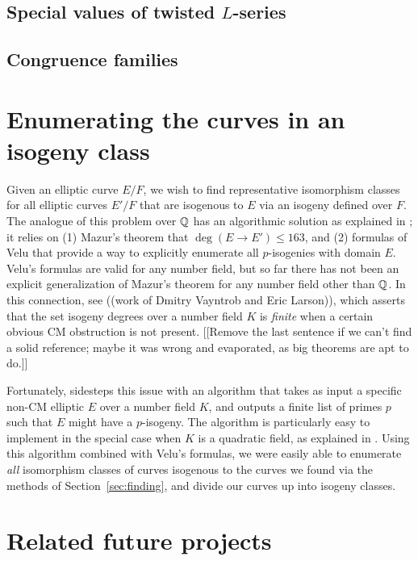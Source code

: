 \documentclass{amsart}
\begin{document}
\subsection{Special values of twisted $L$-series}

\subsection{Congruence families}



\section{Enumerating the curves in an isogeny class}\label{sec:isoclass}

Given an elliptic curve $E/F$, we wish to find representative
isomorphism classes for all elliptic curves $E'/F$ that are isogenous
to $E$ via an isogeny defined over $F$.  The analogue of this problem
over $\mathbb{Q}$ has an algorithmic solution as explained in
\cite[\S3.8]{cremona:algs}; it relies on (1) Mazur's theorem
\cite{mazur:rational} that $\deg(E\to E')\leq 163$, and (2) formulas
of Velu \cite{velu:isogenies} that provide a way to explicitly
enumerate all $p$-isogenies with domain $E$.  Velu's formulas are
valid for any number field, but so far there has not been an explicit
generalization of Mazur's theorem for any number field other than
$\mathbb{Q}$.  In this connection, see \cite{} ((work of Dmitry Vayntrob and
Eric Larson)), which asserts that the set isogeny degrees over a
number field $K$ is {\em finite} when a certain obvious CM obstruction
is not present.  [[Remove the last sentence if we can't find a solid 
reference; maybe it was wrong and evaporated, as big theorems are
apt to do.]]

Fortunately, \cite{billerey:isog} sidesteps this issue with an
algorithm that takes as input a specific non-CM elliptic $E$ over a
number field $K$, and outputs a finite list of primes $p$ such that
$E$ might have a $p$-isogeny.  The algorithm is particularly easy to
implement in the special case when $K$ is a quadratic field, as
explained in \cite[\S2.3.4]{billerey:isog}.  Using this algorithm
combined with Velu's formulas, we were easily able to enumerate {\em
  all} isomorphism classes of curves isogenous to the curves we found
via the methods of Section~\ref{sec:finding}, and divide our curves up into
isogeny classes.


\section{Related future projects}\label{sec:future}
\end{document}
